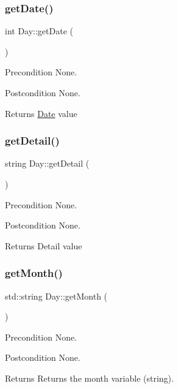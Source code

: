 \subsubsection{\texorpdfstring{get\+Date()}{getDate()}}
{\footnotesize\ttfamily int Day\+::get\+Date (\begin{DoxyParamCaption}{ }\end{DoxyParamCaption})}

\begin{DoxyPrecond}{Precondition}
None. 
\end{DoxyPrecond}
\begin{DoxyPostcond}{Postcondition}
None. 
\end{DoxyPostcond}
\begin{DoxyReturn}{Returns}
\hyperlink{struct_date}{Date} value 
\end{DoxyReturn}
\hypertarget{class_day_adf187d211b1ea4561832486f7094b18b}{}\label{class_day_adf187d211b1ea4561832486f7094b18b} 
\subsubsection{\texorpdfstring{get\+Detail()}{getDetail()}}
{\footnotesize\ttfamily string Day\+::get\+Detail (\begin{DoxyParamCaption}{ }\end{DoxyParamCaption})}

\begin{DoxyPrecond}{Precondition}
None. 
\end{DoxyPrecond}
\begin{DoxyPostcond}{Postcondition}
None. 
\end{DoxyPostcond}
\begin{DoxyReturn}{Returns}
Detail value 
\end{DoxyReturn}
\hypertarget{class_day_ae10fc576ccdf6d58ef42c8cd1b371401}{}\label{class_day_ae10fc576ccdf6d58ef42c8cd1b371401} 
\subsubsection{\texorpdfstring{get\+Month()}{getMonth()}}
{\footnotesize\ttfamily std\+::string Day\+::get\+Month (\begin{DoxyParamCaption}{ }\end{DoxyParamCaption})}

\begin{DoxyPrecond}{Precondition}
None. 
\end{DoxyPrecond}
\begin{DoxyPostcond}{Postcondition}
None. 
\end{DoxyPostcond}
\begin{DoxyReturn}{Returns}
Returns the month variable (string). 
\end{DoxyReturn}
\hypertarget{class_day_ac0d1e5a970de4e30bc563c33cf69cbc3}{}\label{class_day_ac0d1e5a970de4e30bc563c33cf69cbc3} 
